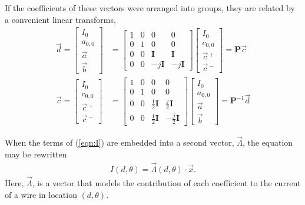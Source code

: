 \documentclass{article}
\begin{document}
If the coefficients of these vectors were arranged into groups, they are related by a convenient linear transforms,
\begin{align}
\vec{d} = \left[\begin{array}{c}
I_0\\
a_{0,0}\\
\vec{a}\\
\vec{b}
\end{array}\right] &= 
\left[\begin{array}{cccc}
1 & 0 & 0 & 0\\
0 & 1 & 0 & 0\\
0 & 0 & \mathbf{I} & \mathbf{I}\\
0 & 0 & -j\mathbf{I} & -j\mathbf{I}
\end{array}\right]
\left[\begin{array}{c}
I_0\\
c_{0,0}\\
\vec{c}\,^+\\
\vec{c}\,^-
\end{array}\right] = \mathbf{P} \vec{c}\\
\vec{c} = \left[\begin{array}{c}
I_0\\
c_{0,0}\\
\vec{c}\,^+\\
\vec{c}\,^-
\end{array}\right] &= 
\left[\begin{array}{cccc}
1 & 0 & 0 & 0\\
0 & 1 & 0 & 0\\
0 & 0 & \frac{1}{2} \mathbf{I} & \frac{j}{2} \mathbf{I}\\
0 & 0 & \frac{1}{2} \mathbf{I} & -\frac{j}{2} \mathbf{I}
\end{array}\right]
\left[\begin{array}{c}
I_0\\
a_{0,0}\\
\vec{a}\\
\vec{b}
\end{array}\right] = \mathbf{P}^{-1} \vec{d}
\end{align}

When the terms of (\ref{eqn:I}) are embedded into a second vector, $\vec{\Lambda}$, the equation may be rewritten
\begin{align}
I(d,\theta) = \vec{\Lambda}(d,\theta) \cdot \vec{x}.
\end{align}
Here, $\vec{\Lambda}$, is a vector that models the contribution of each coefficient to the current of a wire in location $(d,\theta)$.
\end{document}
